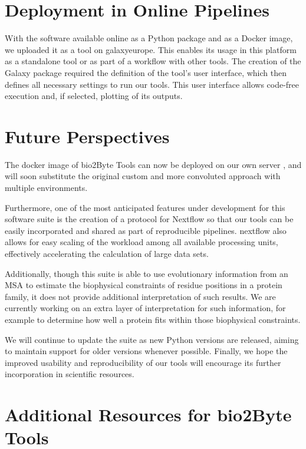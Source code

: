\section{Deployment in Online Pipelines}
With the software available online as a Python package and as a Docker image, we uploaded it as a tool on \gls{galaxyeurope}. This enables its usage in this platform as a standalone tool or as part of a workflow with other tools. The creation of the Galaxy package required the definition of the tool's user interface, which then defines all necessary settings to run our tools. This user interface allows code-free execution and, if selected, plotting of its outputs.

\section{Future Perspectives}

The docker image of bio2Byte Tools can now be deployed on our own server \cite{kagami_b2btools_2021}, and will soon substitute the original custom and more convoluted approach with multiple environments. 

Furthermore, one of the most anticipated features under development for this software suite is the creation of a protocol for Nextflow \cite{di_tommaso_nextflow_2017} so that our tools can be easily incorporated and shared as part of reproducible pipelines. \Gls{nextflow} also allows for easy scaling of the workload among all available processing units, effectively accelerating the calculation of large data sets. 

Additionally, though this suite is able to use evolutionary information from an MSA to estimate the biophysical constraints of residue positions in a protein family, it does not provide additional interpretation of such results. We are currently working on an extra layer of interpretation for such information, for example to determine how well a protein fits within those biophysical constraints. 

We will continue to update the suite as new Python versions are released, aiming to maintain support for older versions whenever possible. Finally, we hope the improved usability and reproducibility of our tools will encourage its further incorporation in scientific resources.


\section*{Additional Resources for bio2Byte Tools}

